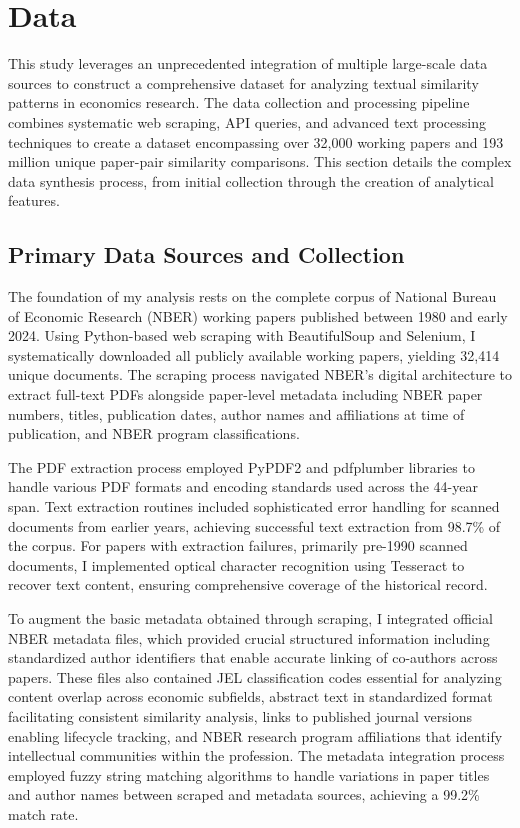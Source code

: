 \documentclass[12pt]{article}
\begin{document}
\section{Data}
\label{sec:data}

This study leverages an unprecedented integration of multiple large-scale data sources to construct a comprehensive dataset for analyzing textual similarity patterns in economics research. The data collection and processing pipeline combines systematic web scraping, API queries, and advanced text processing techniques to create a dataset encompassing over 32,000 working papers and 193 million unique paper-pair similarity comparisons. This section details the complex data synthesis process, from initial collection through the creation of analytical features.

\subsection{Primary Data Sources and Collection}

The foundation of my analysis rests on the complete corpus of National Bureau of Economic Research (NBER) working papers published between 1980 and early 2024. Using Python-based web scraping with BeautifulSoup and Selenium, I systematically downloaded all publicly available working papers, yielding 32,414 unique documents. The scraping process navigated NBER's digital architecture to extract full-text PDFs alongside paper-level metadata including NBER paper numbers, titles, publication dates, author names and affiliations at time of publication, and NBER program classifications.

The PDF extraction process employed PyPDF2 and pdfplumber libraries to handle various PDF formats and encoding standards used across the 44-year span. Text extraction routines included sophisticated error handling for scanned documents from earlier years, achieving successful text extraction from 98.7\% of the corpus. For papers with extraction failures, primarily pre-1990 scanned documents, I implemented optical character recognition using Tesseract to recover text content, ensuring comprehensive coverage of the historical record.

To augment the basic metadata obtained through scraping, I integrated official NBER metadata files, which provided crucial structured information including standardized author identifiers that enable accurate linking of co-authors across papers. These files also contained JEL classification codes essential for analyzing content overlap across economic subfields, abstract text in standardized format facilitating consistent similarity analysis, links to published journal versions enabling lifecycle tracking, and NBER research program affiliations that identify intellectual communities within the profession. The metadata integration process employed fuzzy string matching algorithms to handle variations in paper titles and author names between scraped and metadata sources, achieving a 99.2\% match rate.
\end{document}
